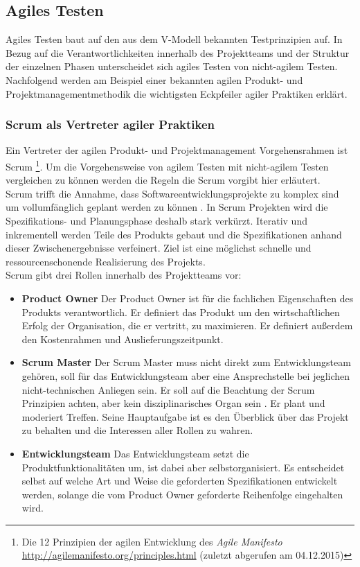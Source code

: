 \subsection{Agiles Testen}
Agiles Testen baut auf den aus dem V-Modell bekannten Testprinzipien auf. In Bezug auf die Verantwortlichkeiten innerhalb des Projektteams und der Struktur der einzelnen Phasen unterscheidet sich agiles Testen von nicht-agilem Testen. Nachfolgend werden am Beispiel einer bekannten agilen Produkt- und Projektmanagementmethodik die wichtigsten Eckpfeiler agiler Praktiken erklärt.

\subsubsection{Scrum als Vertreter agiler Praktiken}
\label{sec:scrum}
Ein Vertreter der agilen Produkt- und Projektmanagement Vorgehensrahmen ist Scrum \footnote{Die 12 Prinzipien der agilen Entwicklung des \textit{Agile Manifesto} \url{http://agilemanifesto.org/principles.html} (zuletzt abgerufen am 04.12.2015)}. Um die Vorgehensweise von agilem Testen mit nicht-agilem Testen vergleichen zu können werden die Regeln die Scrum vorgibt hier erläutert.\\
Scrum trifft die Annahme, dass Softwareentwicklungsprojekte zu komplex sind um vollumfänglich geplant werden zu können \cite{linz_testing_2014}. In Scrum Projekten wird die Spezifikations- und Planungsphase deshalb stark verkürzt. Iterativ und inkrementell werden Teile des Produkts gebaut und die Spezifikationen anhand dieser Zwischenergebnisse verfeinert. Ziel ist eine möglichst schnelle und ressourcenschonende Realisierung des Projekts.\\
Scrum gibt drei Rollen innerhalb des Projektteams vor:

\begin{itemize}
\item \textbf{Product Owner} Der Product Owner ist für die fachlichen Eigenschaften des Produkts verantwortlich. Er definiert das Produkt um den wirtschaftlichen Erfolg der Organisation, die er vertritt, zu maximieren. Er definiert außerdem den Kostenrahmen und Auslieferungszeitpunkt.
\item \textbf{Scrum Master} Der Scrum Master muss nicht direkt zum Entwicklungsteam gehören, soll für das Entwicklungsteam aber eine Ansprechstelle bei jeglichen nicht-technischen Anliegen sein. Er soll auf die Beachtung der Scrum Prinzipien achten, aber kein disziplinarisches Organ sein \cite{linz_testing_2014}. Er plant und moderiert Treffen. Seine Hauptaufgabe ist es den Überblick über das Projekt zu behalten und die Interessen aller Rollen zu wahren.
\item \textbf{Entwicklungsteam} Das Entwicklungsteam setzt die Produktfunktionalitäten um, ist dabei aber selbstorganisiert. Es entscheidet selbst auf welche Art und Weise die geforderten Spezifikationen entwickelt werden, solange die vom Product Owner geforderte Reihenfolge eingehalten wird.
\end{itemize}

